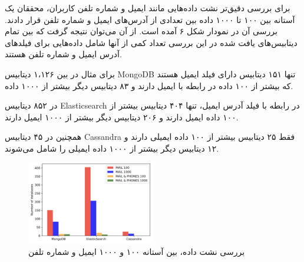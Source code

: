 \documentclass[10pt, a4paper]{article}
\begin{document}
برای بررسی دقیق‌تر نشت داده‌هایی مانند ایمیل و شماره تلفن کاربران، محققان یک
آستانه بین ۱۰۰ تا ۱۰۰۰ داده بین تعدادی از آدرس‌های ایمیل و شماره تلفن قرار
دادند. بررسی آن در نمودار شکل ۶ آمده است. از آن می‌توان نتیجه گرفت که بین تمام
دیتابیس‌های یافت شده در این بررسی تعداد کمی از آنها شامل داده‌هایی برای فیلد‌های
آدرس ایمیل و شماره تلفن هستند.


برای مثال در بین ۱،۱۲۶ دیتابیس MongoDB تنها ۱۵۱ دیتابیس دارای فیلد ایمیل هستند
که بیشتر از ۱۰۰ داده در رابطه با ایمیل دارند و ۸۳ دیتابیس دیگر بیشتر از ۱۰۰۰
داده. 

در ۸۵۲ دیتابیس Elasticsearch در رابطه با فیلد آدرس ایمیل، تنها ۴۰۴ دیتابیس بیشتر
از ۱۰۰ داده ایمیل دارند و ۲۰۶ دیتابیس دیگر بیشتر از ۱۰۰۰ ایمیل دارند.

همچنین در ۴۵ دیتابیس Cassandra فقط ۲۵ دیتابیس بیشتر از ۱۰۰ داده ایمیلی دارند و
۱۲ دیتابیس دیگر بیشتر از ۱۰۰۰ داده ایمیلی را شامل می‌شوند.

\begin{figure}
    \centering
    \includegraphics[width=0.5\textwidth]{res/fig5.png}
    \caption{بررسی نشت داده، بین آستانه ۱۰۰ و ۱۰۰۰ ایمیل و شماره تلفن}
    \label{fig: diagram}
\end{figure}
\end{document}
